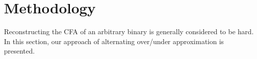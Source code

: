\documentclass{kththesis}
\begin{document}




\chapter{Methodology}\label{chap:methodlogy}



Reconstructing the CFA of an arbitrary binary is generally considered to be hard\cite{Jakstab}. In this section, our approach of alternating over/under approximation is presented. %
\end{document}
